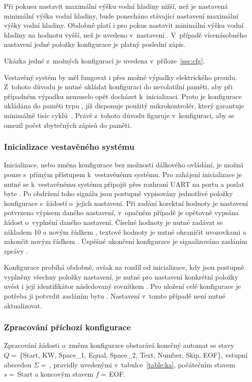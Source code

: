         Při pokusu nastavit maximální výšku vodní hladiny nižší, než je nastavená minimální výška vodní hladiny, bude ponecháno stávající nastavení maximální výšky vodní hladiny. Obdobně platí i pro pokus nastavit minimální výšku vodní hladiny na hodnotu vyšší, než je uvedeno v~nastavení . V~případě vícenásobného nastavení jedné položky konfigurace je platný poslední zápis.

        Ukázka jedné z~možných konfigurací je uvedena v~příloze~\ref{sec:cfg}.

        Vestavěný systém by měl fungovat i přes možné výpadky elektrického proudu. Z~tohoto důvodu je nutné ukládat konfiguraci do nevolatilní paměti, aby při případném výpadku nemuselo opět docházet k~inicializaci. Proto je konfigurace ukládána do paměti typu , jíž disponuje použitý mikrokontrolér, který garantuje minimálně tisíc cyklů~\cite{stm:datasheet}. Právě z~tohoto důvodu figuruje  v~konfiguraci, aby se omezil počet zbytečných zápisů do paměti.

        \subsubsection{Inicializace vestavěného systému}
            Inicializace, nebo změna konfigurace bez možnosti dálkového ovládání, je možná pouze s~přímým přístupem k~vestavěnému systému. 
            Pro zahájení inicializace je nutné se k~vestavěnému systému připojit přes rozhraní UART na portu  a poslat byte . Po obdržení toho signálu jsou postupně vypisovány jednotlivé položky konfigurace s~žádostí o~jejich nastavení. Při zadání korektní hodnoty je nastavení potvrzeno výpisem daného nastavení, v~opačném případě je opětovně vypsána žádost o~vyplnění daného nastavení. Číselné hodnoty je nutné zadávat se základem 10 a novým řádkem , textové hodnoty je nutné ohraničit uvozovkami a zakončit novým řádkem . Úspěšné ukončení konfigurace je signalizováno zasláním zprávy .

            Konfigurace probíhá obdobně, avšak na rozdíl od inicializace, kdy jsou postupně vyplněny všechny položky nastavení, je nutné pro nastavení konkrétní položky uvést i její identifikátor následovaný rovnítkem . Pro uložení celé konfigurace je potřeba ji potvrdit zasláním bytu . Nastavení  v~tomto případě není nutné aktualizovat.

        \subsubsection{Zpracování příchozí konfigurace}
            Zpracování žádosti o~změnu konfigurace obstarává konečný automat se stavy $Q=\,$\{Start, KW, Space\_1, Equal, Space\_2, Text, Number, Skip, EOF\}, vstupní abecedou $\Sigma=\,$, pravidly uvedenými v~tabulce~\ref{table:ka}, počátečním stavem $s=\,$Start a koncovým stavem $f=\,$EOF.

